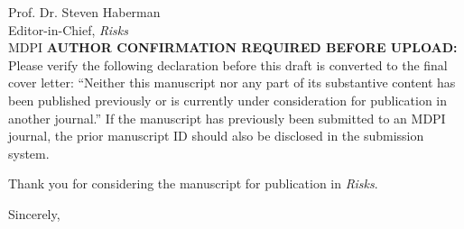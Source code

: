 \documentclass[11pt,a4paper]{letter}
\begin{document}
\begin{letter}{Prof. Dr. Steven Haberman\\Editor-in-Chief, \textit{Risks}\\MDPI}
\textbf{AUTHOR CONFIRMATION REQUIRED BEFORE UPLOAD:} Please verify the following declaration before this draft is converted to the final cover letter: ``Neither this manuscript nor any part of its substantive content has been published previously or is currently under consideration for publication in another journal.'' If the manuscript has previously been submitted to an MDPI journal, the prior manuscript ID should also be disclosed in the submission system.

Thank you for considering the manuscript for publication in \textit{Risks}.

\closing{Sincerely,}
\end{letter}
\end{document}

